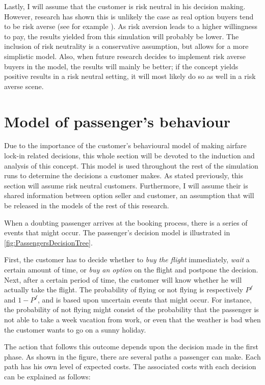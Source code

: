 Lastly, I will assume that the customer is risk neutral in his decision making. However, research has shown this is unlikely the case as real option buyers tend to be risk averse (see for example \cite{miller2004empirical}). As risk aversion leads to a higher willingness to pay, the results yielded from this simulation will probably be lower. The inclusion of risk neutrality is a conservative assumption, but allows for a more simplistic model. Also, when future research decides to implement risk averse buyers in the model, the results will mainly be better; if the concept yields positive results in a risk neutral setting, it will most likely do so as well in a risk averse scene.


\section{Model of passenger's behaviour}
\label{sec:ModelPassengerBehaviour}
Due to the importance of the customer's behavioural model of making airfare lock-in related decisions, this whole section will be devoted to the induction and analysis of this concept. This model is used throughout the rest of the simulation runs to determine the decisions a customer makes. As stated previously, this section will assume risk neutral customers. Furthermore, I will assume their is shared information between option seller and customer, an assumption that will be released in the models of the rest of this research.

When a doubting passenger arrives at the booking process, there is a series of events that might occur. The passenger's decision model is illustrated in \autoref{fig:PassengersDecisionTree}.


First, the customer has to decide whether to \emph{buy the flight} immediately, \emph{wait} a certain amount of time, or \emph{buy an option} on the flight and postpone the decision. Next, after a certain period of time, the customer will know whether he will actually take the flight. The probability of flying or not flying is respectively $P^f$ and $1 - P^f$, and is based upon uncertain events that might occur. For instance, the probability of not flying might consist of the probability that the passenger is not able to take a week vacation from work, or even that the weather is bad when the customer wants to go on a sunny holiday.

The action that follows this outcome depends upon the decision made in the first phase. As shown in the figure, there are several paths a passenger can make. Each path has his own level of expected costs. The associated costs with each decision can be explained as follows:

